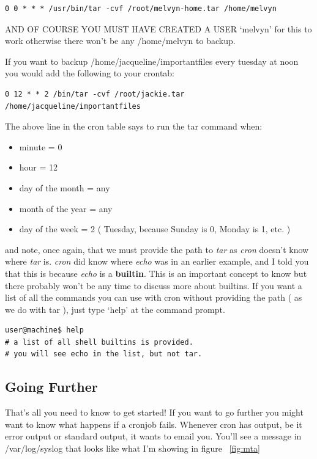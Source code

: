 \documentclass[12pt,a4paper]{article}
\begin{document}
\begin{lstlisting}[style=term]
0 0 * * * /usr/bin/tar -cvf /root/melvyn-home.tar /home/melvyn
\end{lstlisting}

AND OF COURSE YOU MUST HAVE CREATED A USER `melvyn' for this to work otherwise
there won't be any /home/melvyn to backup.

If you want to backup /home/jacqueline/importantfiles every tuesday at noon you
would add the following to your crontab:

\begin{lstlisting}[style=term]
0 12 * * 2 /bin/tar -cvf /root/jackie.tar /home/jacqueline/importantfiles
\end{lstlisting}

The above line in the cron table says to run the  tar command when:
\begin{itemize}
\item minute = 0
\item hour = 12
\item day of the month = any
\item month of the year = any
\item day of the week = 2 ( Tuesday, because Sunday is 0, Monday is 1, etc. )
\end{itemize}

and note, once again, that we must provide the path to \textit{tar} as
\textit{cron} doesn't know
where \textit{tar} is. \textit{cron} did know where \textit{echo} was in an earlier example, and I told you
that this is because \textit{echo} is a \textbf{builtin}. This is an important
concept to know but there probably won't be any time to discuss more about
builtins. If you want a list of all the commands you can use with cron without
providing the path ( as we do with tar ), just type `help' at the command
prompt. 

\begin{lstlisting}[style=term]
user@machine$ help
# a list of all shell builtins is provided. 
# you will see echo in the list, but not tar.
\end{lstlisting}

\subsection{Going Further}
That's all you need to know to get started! If you want to go further you might
want to know what happens if a cronjob fails. Whenever cron has output, be it
error output or standard output, it wants to email you. You'll see a message in
/var/log/syslog that looks like what I'm showing in figure ~\ref{fig:mta}
\end{document}
